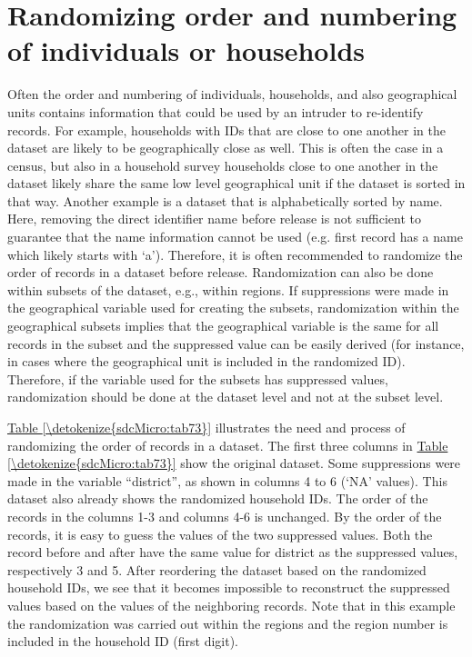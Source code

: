 \documentclass[letterpaper,10pt,english]{sphinxmanual}
\begin{document}
\section{Randomizing order and numbering of individuals or households}
\label{\detokenize{sdcMicro:randomizing-order-and-numbering-of-individuals-or-households}}
Often the order and numbering of individuals, households, and also
geographical units contains information that could be used by an
intruder to re-identify records. For example, households with IDs that
are close to one another in the dataset are likely to be geographically
close as well. This is often the case in a census, but also in a
household survey households close to one another in the dataset likely
share the same low level geographical unit if the dataset is sorted in
that way. Another example is a dataset that is alphabetically sorted by
name. Here, removing the direct identifier name before release is not
sufficient to guarantee that the name information cannot be used (e.g.
first record has a name which likely starts with ‘a’). Therefore, it is
often recommended to randomize the order of records in a dataset before
release. Randomization can also be done within subsets of the dataset,
e.g., within regions. If suppressions were made in the geographical
variable used for creating the subsets, randomization within the
geographical subsets implies that the geographical variable is the same
for all records in the subset and the suppressed value can be easily
derived (for instance, in cases where the geographical unit is included
in the randomized ID). Therefore, if the variable used for the subsets
has suppressed values, randomization should be done at the dataset level
and not at the subset level.

\hyperref[\detokenize{sdcMicro:tab73}]{Table \ref{\detokenize{sdcMicro:tab73}}} illustrates the need and process of randomizing the order of
records in a dataset. The first three columns in \hyperref[\detokenize{sdcMicro:tab73}]{Table \ref{\detokenize{sdcMicro:tab73}}} show the
original dataset. Some suppressions were made in the variable
“district”, as shown in columns 4 to 6 (‘NA’ values). This dataset also
already shows the randomized household IDs. The order of the records in
the columns 1-3 and columns 4-6 is unchanged. By the order of the
records, it is easy to guess the values of the two suppressed values.
Both the record before and after have the same value for district as the
suppressed values, respectively 3 and 5. After reordering the dataset
based on the randomized household IDs, we see that it becomes impossible
to reconstruct the suppressed values based on the values of the
neighboring records. Note that in this example the randomization was
carried out within the regions and the region number is included in the
household ID (first digit).
\end{document}
